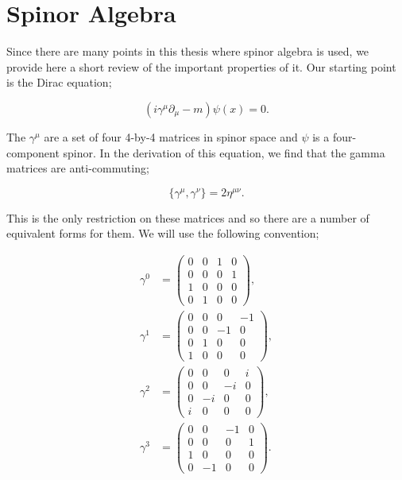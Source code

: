 \chapter{Spinor Algebra}
\label{app:spinor}

Since there are many points in this thesis where spinor algebra is used, we provide here a short review of the important properties of it. Our starting point is the Dirac equation;

\begin{equation}
(i \gamma^\mu \partial_\mu - m) \psi(x) = 0.
\end{equation}

The $\gamma^\mu$ are a set of four 4-by-4 matrices in spinor space and $\psi$ is a four-component spinor. In the derivation of this equation, we find that the gamma matrices are anti-commuting;

\begin{equation}
\{ \gamma^\mu, \gamma^\nu \} = 2 \eta^{\mu \nu}.
\end{equation}

This is the only restriction on these matrices and so there are a number of equivalent forms for them. We will use the following convention; 

\begin{subequations}
\begin{align}
\gamma^0 &= 
 \begin{pmatrix}
  0 & 0 & 1 & 0\\
  0 & 0 & 0 & 1\\
  1 & 0 & 0 & 0\\
  0 & 1 & 0 & 0
 \end{pmatrix},\\
 \gamma^1 &= 
 \begin{pmatrix}
  0 & 0 & 0 & -1\\
  0 & 0 & -1 & 0\\
  0 & 1 & 0 & 0\\
  1 & 0 & 0 & 0
 \end{pmatrix},\\
 \gamma^2 &= 
 \begin{pmatrix}
  0 & 0 & 0 & i\\
  0 & 0 & -i & 0\\
  0 & -i & 0 & 0\\
  i & 0 & 0 & 0
 \end{pmatrix},\\
 \gamma^3 &= 
 \begin{pmatrix}
  0 & 0 & -1 & 0\\
  0 & 0 & 0 & 1\\
  1 & 0 & 0 & 0\\
  0 & -1 & 0 & 0
 \end{pmatrix}.
 \end{align}
 \end{subequations}
 
